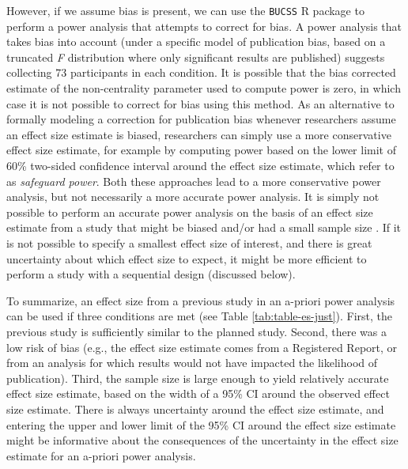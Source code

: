 \documentclass[
]{krantz}
\begin{document}
However, if we assume bias is present, we can use the \texttt{BUCSS} R package \citep{anderson_sample-size_2017} to perform a power analysis that attempts to correct for bias. A power analysis that takes bias into account (under a specific model of publication bias, based on a truncated \emph{F} distribution where only significant results are published) suggests collecting 73 participants in each condition. It is possible that the bias corrected estimate of the non-centrality parameter used to compute power is zero, in which case it is not possible to correct for bias using this method. As an alternative to formally modeling a correction for publication bias whenever researchers assume an effect size estimate is biased, researchers can simply use a more conservative effect size estimate, for example by computing power based on the lower limit of 60\% two-sided confidence interval around the effect size estimate, which \citet{perugini_safeguard_2014} refer to as \emph{safeguard power}. Both these approaches lead to a more conservative power analysis, but not necessarily a more accurate power analysis. It is simply not possible to perform an accurate power analysis on the basis of an effect size estimate from a study that might be biased and/or had a small sample size \citep{teare_sample_2014}. If it is not possible to specify a smallest effect size of interest, and there is great uncertainty about which effect size to expect, it might be more efficient to perform a study with a sequential design (discussed below).

To summarize, an effect size from a previous study in an a-priori power analysis can be used if three conditions are met (see Table \ref{tab:table-es-just}). First, the previous study is sufficiently similar to the planned study. Second, there was a low risk of bias (e.g., the effect size estimate comes from a Registered Report, or from an analysis for which results would not have impacted the likelihood of publication). Third, the sample size is large enough to yield relatively accurate effect size estimate, based on the width of a 95\% CI around the observed effect size estimate. There is always uncertainty around the effect size estimate, and entering the upper and lower limit of the 95\% CI around the effect size estimate might be informative about the consequences of the uncertainty in the effect size estimate for an a-priori power analysis.
\end{document}

